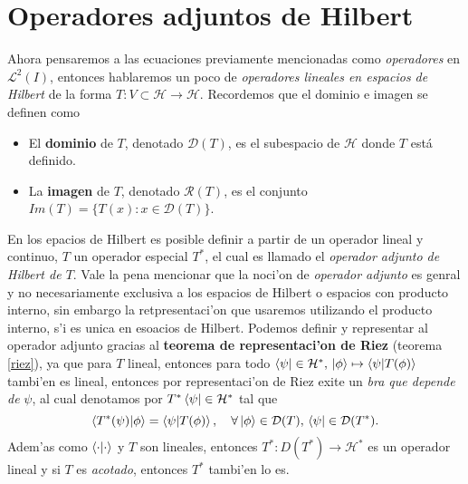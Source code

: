 \documentclass[main.tex]{subfiles}
\begin{document}
\section{Operadores adjuntos de Hilbert}
\noindent Ahora pensaremos a las ecuaciones previamente mencionadas como \emph{operadores} en \(\mathcal{L}^{2}(I)\), entonces hablaremos un poco de \emph{operadores lineales en espacios de Hilbert} de la forma $T:V\subset\mathcal{H}\to\mathcal{H}$. Recordemos que el dominio e imagen se definen como
\begin{itemize}
    \item El \textbf{dominio} de $T$, denotado $\mathcal{D}(T)$, es el subespacio de $\mathcal{H}$ donde $T$ está definido.
    \item La \textbf{imagen} de $T$, denotado $\mathcal{R}(T)$, es el conjunto $Im(T)=\{T(x) : x \in \mathcal{D}(T)\}$.
\end{itemize}
En los epacios de Hilbert es posible definir a partir de un operador lineal y continuo, \(T\) un operador especial \(T^{*}\), el cual es llamado el \emph{operador adjunto de Hilbert de \(T\)}. Vale la pena mencionar que la noci'on de \emph{operador adjunto} es genral y no necesariamente exclusiva a los espacios de Hilbert o espacios con producto interno, sin embargo la retpresentaci'on que usaremos utilizando el producto interno, s'i es unica en esoacios de Hilbert. Podemos definir y representar al operador adjunto gracias al \textbf{teorema de representaci'on de Riez} (teorema \ref{riez}), ya que para \(T\) lineal, entonces para todo \(\bra{\psi}\in\mathcal{H}^{*},\,\ket{\phi}\mapsto\braket{\psi|T(\phi)}\) tambi'en es lineal, entonces por representaci'on de Riez exite un \emph{bra que depende de} \(\psi\), al cual denotamos por \(T^{*}\bra{\psi}\in\mathcal{H}^{*}\) tal que
\[
  \braket{T^{*}(\psi)|\phi}=\braket{\psi| T(\phi)}, \quad \forall \ket{\phi} \in \mathcal{D}(T), \, \bra{\psi} \in \mathcal{D}(T^*).
\]
\noindent Adem'as como \(\braket{\cdot|\cdot}\) y \(T\) son lineales, entonces \(T^{*}:D(T^{*})\to\mathcal{H}^{*}\) es un operador lineal y si \(T\) es \emph{acotado}, entonces \(T^{*}\) tambi'en lo es.
\end{document}

